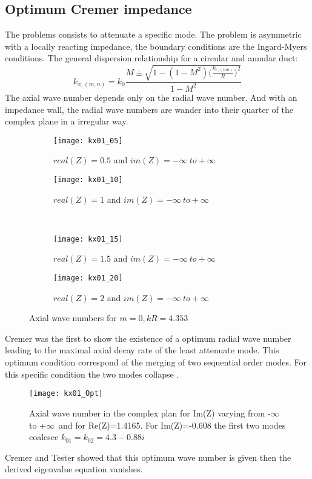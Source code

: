 \subsection{Optimum Cremer impedance}
The problems consists to attenuate a specific mode. The problem is asymmetric with a locally reacting impedance, the boundary conditions are the Ingard-Myers conditions.
The general dispersion relationship for a circular and annular duct:
\begin{equation} 
    k_{x,(m,n)}=k_0\frac{M\pm\sqrt{1-(1-M^2)\Big(\frac{k_{r,(mn)}}{R}\Big)^2}}{1-M^2}
\end{equation}
The axial wave number depends only on the radial wave number. And with an impedance wall, the radial wave numbers are wander into their quarter of the complex plane in a irregular way. 
\begin{figure}[H] \centering
    \begin{subfigure}{.5\textwidth}\centering
     \texttt{[image: kx01\_05]}
     \caption{$real(Z)=0.5$ and $im(Z)=-\infty \ to +\infty$}
    \end{subfigure}%
    \begin{subfigure}{.5\textwidth}\centering
     \texttt{[image: kx01\_10]}
     \caption{$real(Z)=1$ and $im(Z)=-\infty \ to +\infty$}
    \end{subfigure}\\
    \begin{subfigure}{.5\textwidth}\centering
     \texttt{[image: kx01\_15]}
     \caption{$real(Z)=1.5$ and $im(Z)=-\infty \ to +\infty$}
    \end{subfigure}%
    \begin{subfigure}{.5\textwidth}\centering
     \texttt{[image: kx01\_20]}
     \caption{$real(Z)=2$ and $im(Z)=-\infty \ to +\infty$}
    \end{subfigure}
    \caption{Axial wave numbers for $m=0,kR=4.353$ \cite{Kabral_thesis}}
\end{figure}
\noindent Cremer was the first to show the existence of a optimum radial wave number leading to the maximal axial decay rate of the least attenuate mode. This optimum condition correspond of the merging of two sequential order modes. For this specific condition the two modes collapse \cite{An_Introduction_to_Acoustics}.
\begin{figure}[H] \centering
    \texttt{[image: kx01\_Opt]}
    \caption{Axial wave number in the complex plan for Im(Z) varying from -$\infty$ to +$\infty$\ and for Re(Z)=1.4165. For Im(Z)=-0.608 the first two modes coalesce $k_{01}=k_{02}=4.3-0.88i$ \cite{An_Introduction_to_Acoustics}}
\end{figure}
Cremer and Tester showed that this optimum wave number is given then the derived eigenvalue equation vanishes.
